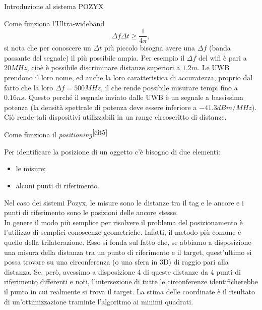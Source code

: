 \documentclass[12pt]{report}
\begin{document}
\begin{section}{Introduzione al sistema POZYX}
\begin{subsection}{Come funziona l'Ultra-wideband}
		\begin{equation}
			\Delta f\Delta t \ge \frac{1}{4\pi},      
		\end{equation}
		si nota che per conoscere un $\Delta t$ più piccolo bisogna avere una $\Delta f$ (banda passante del segnale) il più possibile ampia. Per esempio il $\Delta f$ del wifi è pari a $20MHz$, cioè è possibile discriminare distanze superiori a $1.2 m$. Le UWB prendono il loro nome, ed anche la loro caratteristica di 						accuratezza, proprio dal fatto che la loro $\Delta f = 500MHz$, il che rende possibile misurare tempi fino a $0.16 ns$. Questo perché il segnale inviato dalle UWB è un segnale a bassissima potenza (la densità spettrale di potenza deve essere inferiore a $-41.3dBm/MHz$). Ciò rende tali dispositivi utilizzabili in un 				range circoscritto di distanze.

	\end{subsection}

	\begin{subsection}{Come funziona il \textit{positioning}$^{{\cite{cit5}}}$}
		
		Per identificare la posizione di un oggetto c’è bisogno di due elementi:

		\begin{itemize}
				\item le misure;
				\item alcuni punti di riferimento.
		\end{itemize}

		Nel caso dei sistemi Pozyx, le misure sono le distanze tra il tag e le ancore e i punti di riferimento sono le posizioni delle ancore stesse.\\
		In genere il modo più semplice per risolvere il problema del posizionamento è l'utilizzo di semplici conoscenze geometriche. Infatti, il metodo più comune è quello della trilaterazione. Esso si fonda sul fatto che, se abbiamo a disposizione una misura della distanza tra un punto di riferimento e il target, 								quest’ultimo si possa trovare su una circonferenza (o una sfera in 3D) di raggio pari alla distanza. Se, però, avessimo a disposizione 4 di queste distanze da 4 punti di riferimento differenti e noti, l’intersezione di tutte le circonferenze identificherebbe il punto in cui realmente si trova il target. La stima delle 							coordinate è il risultato di un'ottimizzazione traminte l'algoritmo ai minimi quadrati.
 
	\end{subsection}


\end{section}
\end{document}
